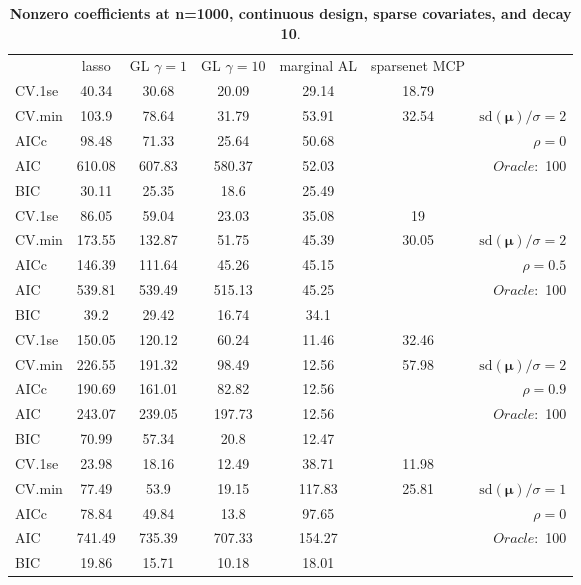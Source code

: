 \begin{table}\vspace{-.5cm}
\caption[l]{ { \bf Nonzero coefficients at n=1000, continuous design, 
sparse covariates, and  decay  10}.}
\vspace{-.5cm}
\footnotesize{}
\begin{center}
\begin{tabular}{l*{5}{c}|r}
& lasso & GL $\gamma=1$ & GL $\gamma=10$ & marginal AL & sparsenet MCP  & \\
 \cline{1-7}
CV.1se & 40.34 & 30.68 & 20.09 & 29.14 & 18.79 & \\
CV.min & 103.9 & 78.64 & 31.79 & 53.91 & 32.54 &  $\mathrm{sd}(\mathbf{\mu})/\sigma=2$ \\
AICc & 98.48 & 71.33 & 25.64 & 50.68 & & $\rho=0$ \\
AIC & 610.08 & 607.83 & 580.37 & 52.03 & &  \multirow{2}{*}{$Oracle: $ 100} \\
BIC & 30.11 & 25.35 & 18.6 & 25.49 & &  \\
 \hline 
CV.1se & 86.05 & 59.04 & 23.03 & 35.08 & 19 & \\
CV.min & 173.55 & 132.87 & 51.75 & 45.39 & 30.05 &  $\mathrm{sd}(\mathbf{\mu})/\sigma=2$ \\
AICc & 146.39 & 111.64 & 45.26 & 45.15 & & $\rho=0.5$ \\
AIC & 539.81 & 539.49 & 515.13 & 45.25 & &  \multirow{2}{*}{$Oracle: $ 100} \\
BIC & 39.2 & 29.42 & 16.74 & 34.1 & &  \\
 \hline 
CV.1se & 150.05 & 120.12 & 60.24 & 11.46 & 32.46 & \\
CV.min & 226.55 & 191.32 & 98.49 & 12.56 & 57.98 &  $\mathrm{sd}(\mathbf{\mu})/\sigma=2$ \\
AICc & 190.69 & 161.01 & 82.82 & 12.56 & & $\rho=0.9$ \\
AIC & 243.07 & 239.05 & 197.73 & 12.56 & &  \multirow{2}{*}{$Oracle: $ 100} \\
BIC & 70.99 & 57.34 & 20.8 & 12.47 & &  \\
 \hline 
CV.1se & 23.98 & 18.16 & 12.49 & 38.71 & 11.98 & \\
CV.min & 77.49 & 53.9 & 19.15 & 117.83 & 25.81 &  $\mathrm{sd}(\mathbf{\mu})/\sigma=1$ \\
AICc & 78.84 & 49.84 & 13.8 & 97.65 & & $\rho=0$ \\
AIC & 741.49 & 735.39 & 707.33 & 154.27 & &  \multirow{2}{*}{$Oracle: $ 100} \\
BIC & 19.86 & 15.71 & 10.18 & 18.01 & &  \\

\end{tabular}
\end{center}
\end{table}
